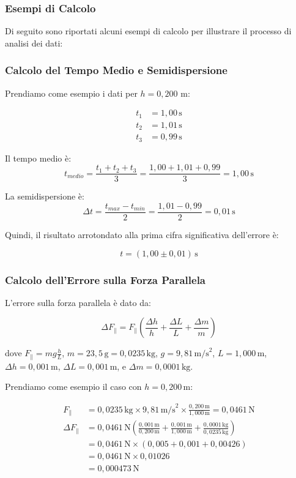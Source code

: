 \subsubsection{Esempi di Calcolo}

Di seguito sono riportati alcuni esempi di calcolo per illustrare il processo di analisi dei dati:

\subsubsection{Calcolo del Tempo Medio e Semidispersione}

Prendiamo come esempio i dati per $h = 0,200$ m:

\begin{align*}
t_1 &= 1,00 \, \text{s} \\
t_2 &= 1,01 \, \text{s} \\
t_3 &= 0,99 \, \text{s}
\end{align*}

Il tempo medio è:
\[ t_{medio} = \frac{t_1 + t_2 + t_3}{3} = \frac{1,00 + 1,01 + 0,99}{3} = 1,00 \, \text{s} \]

La semidispersione è:
\[ \Delta t = \frac{t_{max} - t_{min}}{2} = \frac{1,01 - 0,99}{2} = 0,01 \, \text{s} \]

Quindi, il risultato arrotondato alla prima cifra significativa dell'errore è:

\[ t = (1,00 \pm 0,01) \, \text{s} \]

\subsubsection{Calcolo dell'Errore sulla Forza Parallela}

L'errore sulla forza parallela è dato da:

\[ \Delta F_\parallel = F_\parallel \left( \frac{\Delta h}{h} + \frac{\Delta L}{L} + \frac{\Delta m}{m} \right) \]

dove $F_\parallel = m g \frac{h}{L}$, $m = 23,5 \, \text{g} = 0,0235 \, \text{kg}$, $g = 9,81 \, \text{m/s}^2$, $L = 1,000 \, \text{m}$, $\Delta h = 0,001 \, \text{m}$, $\Delta L = 0,001 \, \text{m}$, e $\Delta m = 0,0001 \, \text{kg}$.

Prendiamo come esempio il caso con $h = 0,200 \, \text{m}$:

\begin{align*}
F_\parallel &= 0,0235 \, \text{kg} \times 9,81 \, \text{m/s}^2 \times \frac{0,200 \, \text{m}}{1,000 \, \text{m}} = 0,0461 \, \text{N} \\[10pt]
\Delta F_\parallel &= 0,0461 \, \text{N} \left( \frac{0,001 \, \text{m}}{0,200 \, \text{m}} + \frac{0,001 \, \text{m}}{1,000 \, \text{m}} + \frac{0,0001 \, \text{kg}}{0,0235 \, \text{kg}} \right) \\[10pt]
&= 0,0461 \, \text{N} \times (0,005 + 0,001 + 0,00426) \\[10pt]
&= 0,0461 \, \text{N} \times 0,01026 \\[10pt]
&= 0,000473 \, \text{N}
\end{align*}

